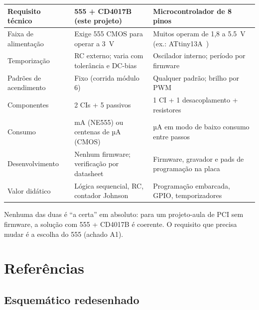 \documentclass[11pt,a4paper]{article}
\begin{document}
\begin{center}
\small
\begin{tabularx}{\linewidth}{@{}L{3.5cm} Y Y@{}}
\toprule
\textbf{Requisito técnico} & \textbf{555 + CD4017B (este projeto)} & \textbf{Microcontrolador de 8 pinos} \\
\midrule
Faixa de alimentação & Exige 555 CMOS para operar a \SI{3}{\volt} & Muitos operam de 1,8 a \SI{5,5}{\volt} (ex.: ATtiny13A~\cite{attiny}) \\
Temporização & RC externo; varia com tolerância e DC-bias & Oscilador interno; período por firmware \\
Padrões de acendimento & Fixo (corrida módulo 6) & Qualquer padrão; brilho por PWM \\
Componentes & 2 CIs + 5 passivos & 1 CI + 1 desacoplamento + resistores \\
Consumo & mA (NE555) ou centenas de µA (CMOS) & µA em modo de baixo consumo entre passos \\
Desenvolvimento & Nenhum firmware; verificação por datasheet & Firmware, gravador e pads de programação na placa \\
Valor didático & Lógica sequencial, RC, contador Johnson & Programação embarcada, GPIO, temporizadores \\
\bottomrule
\end{tabularx}
\end{center}

Nenhuma das duas é “a certa” em absoluto: para um projeto-aula de PCI sem firmware, a
solução com 555 + CD4017B é coerente. O requisito que precisa mudar é a escolha do 555
(achado A1).

\section{Referências}\label{sec:refs}
\listaReferencias

\appendix
\begin{landscape}
\section{Esquemático redesenhado}\label{ap:esq}
\begin{center}
\esquematico[blocos]
\end{center}
\end{landscape}
\end{document}
